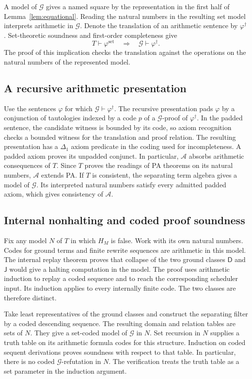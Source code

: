 \documentclass[11pt,letterpaper]{article}
\newcommand{\A}{\mathcal A}
\newcommand{\G}{\mathcal G}
\newcommand{\D}{\mathsf D}
\newcommand{\J}{\mathsf J}
\begin{document}
A model of $\G$ gives a named square by the representation in the
first half of Lemma~\ref{lem:equational}. Reading the natural numbers
in the resulting set model interprets arithmetic in $\G$. Denote the
translation of an arithmetic sentence by $\varphi^\dagger$. Set-theoretic
soundness and first-order completeness give
\[
  T\vdash\varphi^{\mathrm{set}}
  \quad\Longrightarrow\quad
  \G\vdash\varphi^\dagger .
\]
The proof of this implication checks the translation against the
operations on the natural numbers of the represented model.

\subsection{A recursive arithmetic presentation}

Use the sentences $\varphi$ for which $\G\vdash\varphi^\dagger$.
The recursive presentation pads $\varphi$ by a conjunction of
tautologies indexed by a code $p$ of a $\G$-proof of
$\varphi^\dagger$. In the padded sentence, the candidate witness is
bounded by its code, so axiom recognition checks a bounded witness
for the translation and proof relation. The resulting presentation has
a $\Delta_1$ axiom predicate in the coding used for incompleteness.
A padded axiom proves its unpadded conjunct. In particular, $\A$
absorbs arithmetic consequences of $T$. Since $T$ proves the readings
of PA theorems on its natural numbers, $\A$ extends PA. If $T$ is
consistent, the separating term algebra gives a model of $\G$.
Its interpreted natural numbers satisfy every admitted padded axiom,
which gives consistency of $\A$.

\subsection{Internal nonhalting and coded proof soundness}

Fix any model $N$ of $T$ in which $H_M$ is false. Work with its own
natural numbers. Codes for ground terms and finite rewrite sequences
are arithmetic in this model. The internal replay theorem proves
that collapse of the two ground classes $\D$ and $\J$ would give a
halting computation in the model. The proof uses arithmetic induction
to replay a coded sequence and to reach the corresponding scheduler
input. Its induction applies to every internally finite code.
The two classes are therefore distinct.

Take least representatives of the ground classes and construct the
separating filter by a coded descending sequence. The resulting
domain and relation tables are sets of $N$. They give a set-coded
model of $\G$ in $N$. Set recursion in $N$ supplies a truth table
on its arithmetic formula codes for this structure. Induction on
coded sequent derivations proves soundness with respect to that
table. In particular, there is no coded $\G$-refutation in $N$.
The verification treats the truth table as a set parameter in the
induction argument.
\end{document}
